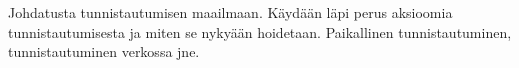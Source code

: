 Johdatusta tunnistautumisen maailmaan. Käydään läpi perus aksioomia tunnistautumisesta ja miten se nykyään hoidetaan. Paikallinen tunnistautuminen, tunnistautuminen verkossa jne.
